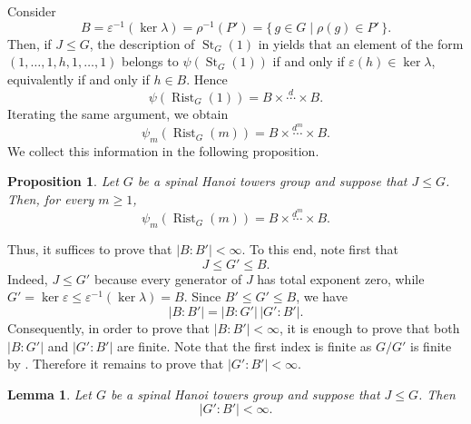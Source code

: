 \documentclass[11pt,leqno]{amsart}
\theoremstyle{plain}
\newtheorem{proposition}[proposition]{Proposition}
\newtheorem{lemma}[lemma]{Lemma}
\DeclareMathOperator{\St}{St}
\DeclareMathOperator{\Rist}{Rist}
\newcommand{\ml}[1]{\textcolor{magenta}{#1}}
\numberwithin{equation}{section}
\begin{document}
Consider
\[
B=\varepsilon^{-1}(\ker\lambda)
=\rho^{-1}(P')
=
\bigl\{\, g\in G \mid \rho(g)\in P' \,\bigr\}.
\]
Then, if $J \le G$, the description of $\St_G(1)$ in
 yields that an element of the form
$(1,\ldots,1,h,1,\ldots,1)$ belongs to $\psi(\St_G(1))$ if and only if
$\varepsilon(h)\in\ker\lambda$, equivalently if and only if $h\in B$. Hence
\[
\psi(\Rist_G(1))
=
B\times\stackrel{d}{\cdots}\times B.
\]
Iterating the same argument,   
we obtain
\[
\psi_m(\Rist_G(  m))
=
B\times\stackrel{d^m}{\cdots}\times B.
\]
We collect this information in the following proposition.

\begin{proposition}\ml{\label{prop:rist-explicit}}
	Let $G$ be a spinal Hanoi towers group and suppose that $J \le G$. Then, for every
	$m\geq 1$,
	\[
	\psi_m(\Rist_G(m))
	=
	B\times\stackrel{d^m}{\cdots}\times B.
	\]
\end{proposition}

Thus, it suffices to prove that $|B:B'|<\infty$. To this end, note first that
\[
J\leq G'\leq B.
\]
Indeed, $J\leq G'$ because every generator of $J$ has total exponent zero, while
$G'=\ker\varepsilon\leq \varepsilon^{-1}(\ker\lambda)=B$. Since $B'\leq G'\leq B$, we have
\[
|B:B'|=|B:G'|\,|G':B'|.
\]
Consequently, in order to prove that $|B:B'|<\infty$, it is enough to prove that both $|B:G'|$ and $|G':B'|$ are finite. Note that the first index is finite as $G/G'$ is finite by .
Therefore it remains to prove that $|G':B'|<\infty$.

\begin{lemma}\label{lemma:Gprime-mod-Bprime-finite}
	Let $G$ be a spinal Hanoi towers group and suppose that $J\leq G$. Then
	\[
	|G':B'|<\infty .
	\]
\end{lemma}
\end{document}
